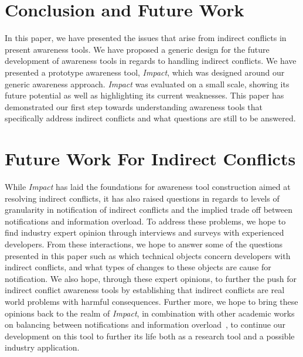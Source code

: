 \documentclass[conference]{IEEEtran}
\begin{document}
\section{Conclusion and Future Work}
In this paper, we have presented the issues that arise from indirect 
conflicts in present awareness tools. We have proposed a generic 
design for the future development of awareness tools in regards to
handling indirect conflicts. We have presented a prototype 
awareness tool, \textit{Impact}, which was designed around our generic 
awareness approach. \textit{Impact} was evaluated on a small scale, showing
its future potential as well as highlighting its current weaknesses. This paper
has demonstrated our first step towards understanding awareness tools
that specifically address indirect conflicts and what questions are 
still to be answered.

\section{Future Work For Indirect Conflicts}
While \textit{Impact} has laid the foundations for awareness tool construction
aimed at resolving indirect conflicts, it has also raised questions 
in regards to levels of granularity in notification of indirect conflicts and the
implied trade off between notifications and information overload. To address
these problems, we hope to find industry expert opinion through interviews
and surveys with experienced developers. From these interactions, we hope to
answer some of the questions presented in this paper such as which technical
objects concern developers with indirect conflicts, and what types of changes
to these objects are cause for notification. We also hope, through these
expert opinions, to further the 
push for indirect conflict awareness tools by establishing that indirect
conflicts are real world problems with harmful consequences. 
Further more, we hope to bring these opinions back to the realm of 
\textit{Impact}, in combination with other academic works on balancing
between notifications and information overload~\cite{Wang:2007}, to
continue our development
on this tool to further its life both as a research tool and a possible
industry application. 





\end{document}
